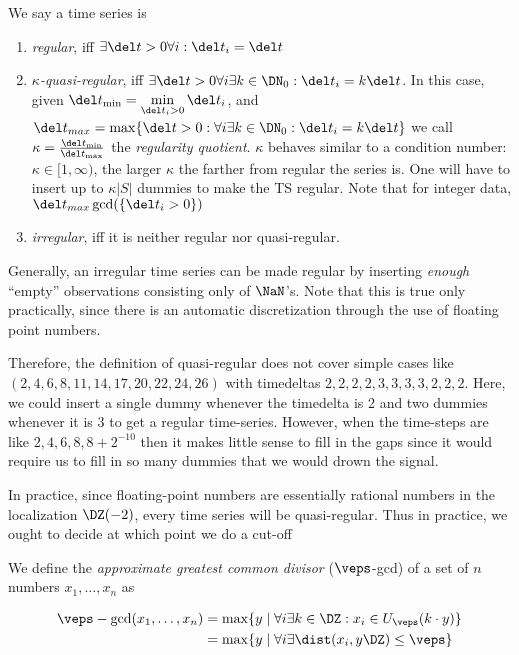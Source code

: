 \documentclass[a4paper,11pt,reqno]{scrartcl}
\begin{document}
%
\begin{definition}[]\label{def: label}
  We say a time series is

%
\begin{enumerate}%
  \item \emph{regular}, iff $\exists \del t>0 \forall i: \del t_i = \del t$
  \item \emph{$\kappa$-quasi-regular}, iff $\exists \del t>0 \forall i\exists k\in \DN_{0} : \del t_i = k\del t$. In this case, given  $\del t_{\min} =  \min\limits_{\del t_i > 0} \del t_i$, and $\del t_{max} = \max\{\del t>0 : \forall i\exists k\in \DN_{0} : \del t_i = k\del t\}$ we call $\kappa = \frac{\del t_{\min}}{\del t_{\max}}$ the \emph{regularity quotient}. $\kappa$ behaves similar to a condition number: $\kappa\in[1, \infty)$, the larger $\kappa$ the farther from regular the series is. One will have to insert up to $\kappa|S|$ dummies to make the TS regular. Note that for integer data, $\del t_{max} \gcd(\{\del t_i>0\})$
  \item \emph{irregular}, iff it is neither regular nor quasi-regular.
\end{enumerate}%

Generally, an irregular time series can be made regular by inserting \emph{enough} ``empty'' observations consisting only of $\NaN$'s. Note that this is true only practically, since there is an automatic discretization through the use of floating point numbers.

Therefore, the definition of quasi-regular does not cover simple cases like $(2,4,6,8,11,14,17,20,22,24,26)$ with timedeltas $2,2,2,2,3,3,3,3,2,2,2$. Here, we could insert a single dummy whenever the timedelta is 2 and two dummies whenever it is $3$ to get a regular time-series. However, when the time-steps are like $2,4,6,8, 8+2^{-10}$ then it makes little sense to fill in the gaps since it would require us to fill in so many dummies that we would drown the signal.


In practice, since floating-point numbers are essentially rational numbers in the localization $\DZ(-2)$, every time series will be quasi-regular. Thus in practice, we ought to decide at which point we do a cut-off

\end{definition}


%
\begin{definition}\label{def: label}
  We define the \emph{approximate greatest common divisor} ($\veps$-gcd) of a set of $n$ numbers $x_1, \ldots, x_n$ as

\begin{align}\label{eq: eps-gpd}
\veps-\gcd(x_1, \ldots, x_n)
   &= \max\{ y \mid \forall i \exists k\in\DZ : x_i \in U_\veps(k\cdot y)\}
\\ &= \max\{ y \mid \forall i \exists \dist(x_i, y\DZ)\le \veps \}
\end{align}

\end{definition}
\end{document}

